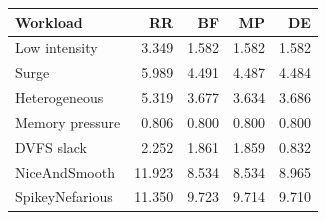 \begin{tabular}{lrrrr}
\toprule
Workload & RR & BF & MP & DE \\
\midrule
Low intensity & 3.349 & 1.582 & 1.582 & 1.582 \\
Surge & 5.989 & 4.491 & 4.487 & 4.484 \\
Heterogeneous & 5.319 & 3.677 & 3.634 & 3.686 \\
Memory pressure & 0.806 & 0.800 & 0.800 & 0.800 \\
DVFS slack & 2.252 & 1.861 & 1.859 & 0.832 \\
NiceAndSmooth & 11.923 & 8.534 & 8.534 & 8.965 \\
SpikeyNefarious & 11.350 & 9.723 & 9.714 & 9.710 \\
\bottomrule
\end{tabular}
